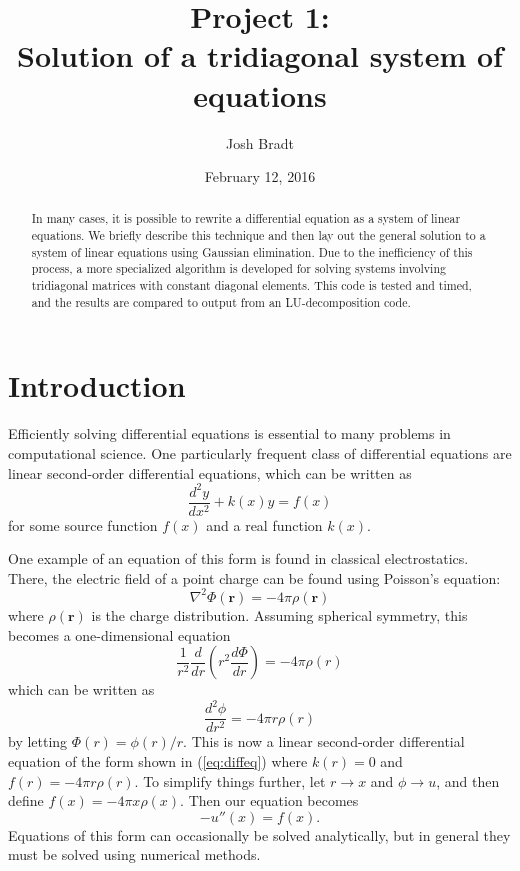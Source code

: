 \documentclass{article}
\title{Project 1:\\Solution of a tridiagonal system of equations}
\author{Josh Bradt}
\date{February 12, 2016}
\begin{document}
\maketitle

\begin{abstract}
    In many cases, it is possible to rewrite a differential equation as a system of linear equations. We briefly describe this technique and then lay out the general solution to a system of linear equations using Gaussian elimination. Due to the inefficiency of this process, a more specialized algorithm is developed for solving systems involving tridiagonal matrices with constant diagonal elements. This code is tested and timed, and the results are compared to output from an LU-decomposition code.
\end{abstract}

\section{Introduction}

    Efficiently solving differential equations is essential to many problems in computational science. One particularly frequent class of differential equations are linear second-order differential equations, which can be written as
    \begin{equation}
        \frac{d^2 y}{dx^2} + k(x) y = f(x)  \label{eq:diffeq}
    \end{equation}
    for some source function $f(x)$ and a real function $k(x)$.

    One example of an equation of this form is found in classical electrostatics. There, the electric field of a point charge can be found using Poisson's equation:
    \begin{equation}
        \nabla^2 \Phi(\mathbf{r}) = -4\pi \rho(\mathbf{r})  \label{eq:poisson}
    \end{equation}
    where $\rho(\mathbf{r})$ is the charge distribution. Assuming spherical symmetry, this becomes a one-dimensional equation
    \begin{equation*}
        \frac{1}{r^2} \frac{d}{dr} \left( r^2 \frac{d\Phi}{dr} \right) = -4\pi\rho(r)
    \end{equation*}
    which can be written as
    \begin{equation*}
        \frac{d^2\phi}{dr^2} = -4\pi r \rho(r)
    \end{equation*}
    by letting $\Phi(r) = \phi(r) / r$. This is now a linear second-order differential equation of the form shown in (\ref{eq:diffeq}) where $k(r) = 0$ and $f(r) = -4\pi r \rho(r)$. To simplify things further, let $r \rightarrow x$ and $\phi \rightarrow u$, and then define $f(x) = -4\pi x \rho(x)$. Then our equation becomes
    \begin{equation*}
        -u''(x) = f(x).
    \end{equation*}
    Equations of this form can occasionally be solved analytically, but in general they must be solved using numerical methods.
\end{document}
